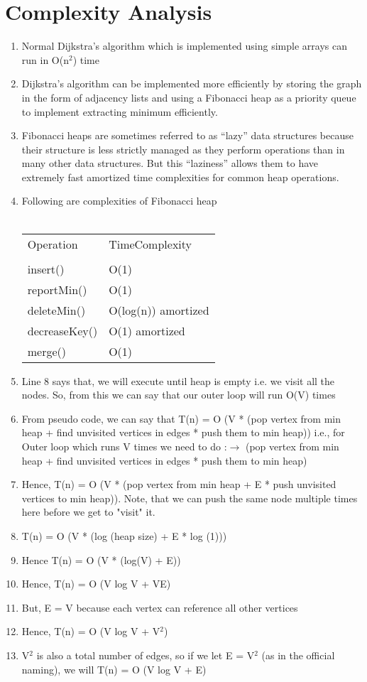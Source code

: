 \documentclass{article}
\begin{document}
\section{Complexity Analysis}
\begin{enumerate}
\item	Normal Dijkstra’s algorithm which is implemented using simple arrays can run in O(n$^{2}$) time
\item	Dijkstra's algorithm can be implemented more efficiently by storing the graph in the form of adjacency lists and using a Fibonacci heap as a priority queue to implement extracting minimum efficiently. 
\item	Fibonacci heaps are sometimes referred to as “lazy” data structures because their structure is less strictly managed as they perform operations than in many other data structures. But this “laziness” allows them to have extremely fast amortized time complexities for common heap operations.
\item	Following are complexities of Fibonacci heap\\\\
\begin{tabular}{ll}
Operation		&	TimeComplexity\\\\
insert()	&		O(1)\\
reportMin()	&		O(1)\\
deleteMin()	&		O(log(n)) amortized\\
decreaseKey()	&	O(1) amortized\\
merge()		&		O(1)\\
\end{tabular}
\item Line 8 says that, we will execute until heap is empty i.e. we visit all the nodes. So, from this we can say that our outer loop will run O(V) times
\item	From pseudo code, we can say that
T(n) = O (V * (pop vertex from min heap + find unvisited vertices in edges * push them to min heap)) 
{i.e., for Outer loop which runs V times we need to do :$\rightarrow$ (pop vertex from min heap + find unvisited vertices in edges * push them to min heap)}
\item	Hence, T(n) =   O (V * (pop vertex from min heap + E * push unvisited vertices to min heap)). 
Note, that we can push the same node multiple times here before we get to "visit" it.
\item	T(n) = O (V * (log (heap size) + E * log (1)))
\item	Hence T(n) = O (V * (log(V) + E))
\item	Hence, T(n) = O (V log V + VE)
\item	But, E = V because each vertex can reference all other vertices
\item	Hence, T(n) = O (V log V + V$^{2}$)
\item	V$^{2}$ is also a total number of edges, so if we let E = V$^{2}$ (as in the official naming), we will T(n) = O (V log V + E)


\end{enumerate}
\end{document}
